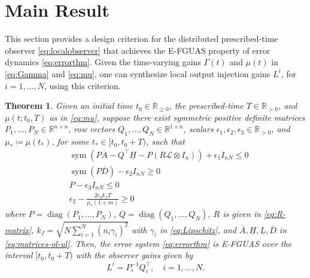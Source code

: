 \documentclass[journal]{IEEEtran}
\newtheorem{theorem}{Theorem}
\newcommand{\diag}{\operatorname{diag}}	%
\newcommand{\sym}{\operatorname{sym}}
\def\T{\top}
\begin{document}
\section{Main Result}

This section provides a design criterion for the distributed prescribed-time observer \eqref{eq:localobserver} that achieves the E-FGUAS property of error dynamics \eqref{eq:errorthm}.
Given the time-varying gains $\Gamma(t)$ and $\mu(t)$ in \eqref{eq:Gamma} and \eqref{eq:mu}, one can synthesize local output injection gains $L^i$, for $i=1,\dots,N$, using this criterion.



\begin{theorem}\label{thm:newthm}
Given an initial time $t_0\in\mathbb R_{\geq 0}$, the prescribed-time $T\in\mathbb R_{>0}$, and $\mu(t;t_0,T)$ as in \eqref{eq:mu}, suppose there exist symmetric positive definite matrices $P_1,\dots,P_N\in\mathbb R^{n\times n}$, row vectors $Q_1,\dots,Q_N\in\mathbb R^{1\times n}$, scalars $\epsilon_1,\epsilon_2,\epsilon_3\in\mathbb R_{>0}$, and $\mu_\ast \coloneq \mu(t_\ast)$, for some $t_\ast\in[t_0,t_0+T)$, such that
\begin{subequations}\label{eq:LMISnew}
    \begin{align}
        \label{eq:LMI-a}
        & \sym\left(P\overline A-Q^{\T}\underline H - P (R\mathcal{L}\otimes I_n)\right)+ \epsilon_1 I_{nN} \leq 0 \\
        \label{eq:LMI-b}
        & \sym(P \overline D) - \epsilon_2 I_{nN} \geq 0 \\
        \label{eq:LMI-c}
        & P-\epsilon_3 I_{nN} \leq 0\\
        \label{eq:LMI-d}
        & \epsilon_2 -\frac{2\epsilon_3k_fT}{\mu_\ast(1+m)} \geq 0
    \end{align}
\end{subequations}
where $P=\diag(P_1,\dots,P_N)$, $Q=\diag(Q_1,\dots,Q_N)$, $R$ is given in \eqref{eq:R-matrix}, $k_f \!=\! \sqrt{N \sum_{i=1}^N (n_i\gamma_i)^2}$ with $\gamma_i$ in \eqref{eq:Lipschitz}, and $\overline A, \underline H, \underline L, \overline D$ in \eqref{eq:matrices-ol-ul}.
Then, the error system \eqref{eq:errorthm} is E-FGUAS over the interval $[t_0,t_0+T)$ with the observer gains given by
\begin{equation}\label{eq:Lsnew}
    L^{i} = P_i^{-1} Q_i^{\T}, \quad i=1,\dots,N.
\end{equation}
\end{theorem}
\end{document}
